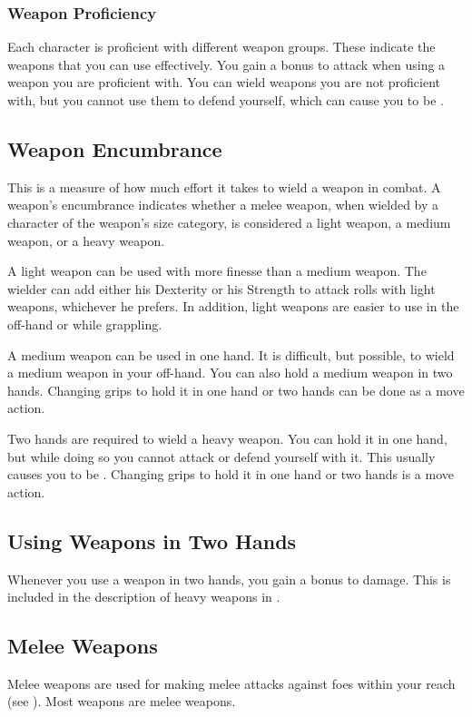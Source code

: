\subsubsection{Weapon Proficiency}
Each character is proficient with different weapon groups. These indicate the weapons that you can use effectively. You gain a  bonus to attack when using a weapon you are proficient with. You can wield weapons you are not proficient with, but you cannot use them to defend yourself, which can cause you to be .

\subsection{Weapon Encumbrance}
This is a measure of how much effort it takes to wield a weapon in combat. A weapon's encumbrance indicates whether a melee weapon, when wielded by a character of the weapon's size category, is considered a light weapon, a medium weapon, or a heavy weapon.

 A light weapon can be used with more finesse than a medium weapon. The wielder can add either his Dexterity or his Strength to attack rolls with light weapons, whichever he prefers. In addition, light weapons are easier to use in the off-hand or while grappling.

 A medium weapon can be used in one hand. It is difficult, but possible, to wield a medium weapon in your off-hand. You can also hold a medium weapon in two hands. Changing grips to hold it in one hand or two hands can be done as a move action.

 Two hands are required to wield a heavy weapon. You can hold it in one hand, but while doing so you cannot attack or defend yourself with it. This usually causes you to be . Changing grips to hold it in one hand or two hands is a move action.

\subsection{Using Weapons in Two Hands}
Whenever you use a weapon in two hands, you gain a  bonus to damage. This is included in the description of heavy weapons in .

\subsection{Melee Weapons}
Melee weapons are used for making melee attacks against foes within your reach (see ). Most weapons are melee weapons.

